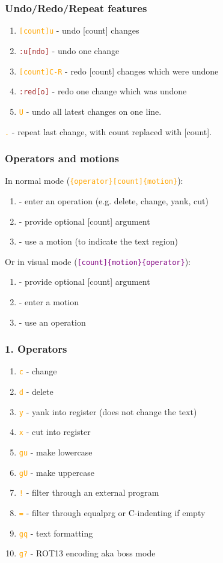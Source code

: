 \documentclass{beamer}
\newcommand{\vimnormal}[1]{\texttt{\textcolor{orange}{#1}}}
\newcommand{\vimcommand}[1]{\texttt{\textcolor{brown}{#1}}}
\newcommand{\vimvisual}[1]{\texttt{\textcolor{purple}{#1}}}
\newcommand{\vimoperator}[1]{\texttt{\textcolor{orange}{#1}}}
\begin{document}
\begin{frame}
    \frametitle{Undo/Redo/Repeat features}
    \begin{enumerate}
        \item \vimnormal{[count]u}   - undo [count] changes
        \item \vimcommand{:u[ndo]}    - undo one change
        \item \vimnormal{[count]C-R} - redo [count] changes which were undone
        \item \vimcommand{:red[o]}    - redo one change which was undone
        \item \vimnormal{U}          - undo all latest changes on one line.
    \end{enumerate}
    \vimnormal{.}          - repeat last change, with count replaced with [count].
\end{frame}

\begin{frame}
    \frametitle{Operators and motions}
    In normal mode (\vimnormal{\{operator\}[count]\{motion\}}):
    \begin{enumerate}
        \item - enter an operation (e.g. delete, change, yank, cut)
        \item - provide optional [count] argument
        \item - use a motion (to indicate the text region)
    \end{enumerate}
    Or in visual mode (\vimvisual{[count]\{motion\}\{operator\}}):
    \begin{enumerate}
        \item - provide optional [count] argument
        \item - enter a motion
        \item - use an operation
    \end{enumerate}
\end{frame}

\begin{frame}
    \frametitle{1. Operators}
    \begin{enumerate}
        \item \vimoperator{c}  - change
        \item \vimoperator{d}  - delete
        \item \vimoperator{y}  - yank into register (does not change the text)
        \item \vimoperator{x}  - cut into register
        \item \vimoperator{gu} - make lowercase
        \item \vimoperator{gU} - make uppercase
        \item \vimoperator{!}  - filter through an external program
        \item \vimoperator{=}  - filter through equalprg or C-indenting if empty
        \item \vimoperator{gq} - text formatting
        \item \vimoperator{g?} - ROT13 encoding aka boss mode
    \end{enumerate}
\end{frame}
\end{document}
